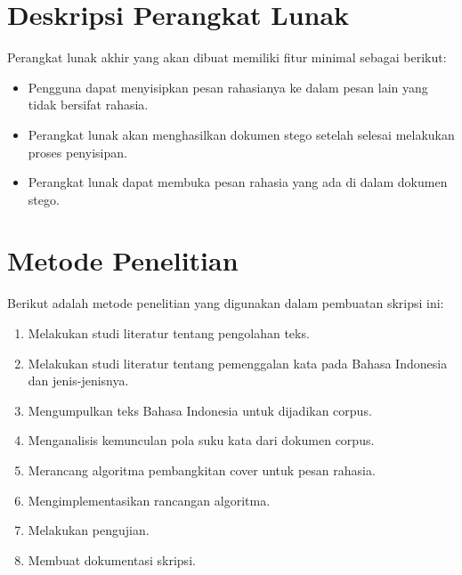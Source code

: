 \section{Deskripsi Perangkat Lunak}
\label{sec:Deskripsi Perangkat Lunak}
Perangkat lunak akhir yang akan dibuat memiliki fitur minimal sebagai berikut:
\begin{itemize}
	\item Pengguna dapat menyisipkan pesan rahasianya ke dalam pesan lain yang tidak bersifat rahasia.
	\item Perangkat lunak akan menghasilkan dokumen stego setelah selesai melakukan proses penyisipan.
	\item Perangkat lunak dapat membuka pesan rahasia yang ada di dalam dokumen stego.
\end{itemize}

\section{Metode Penelitian}
\label{sec:metodePenelitian}
Berikut adalah metode penelitian yang digunakan dalam pembuatan skripsi ini:
	\begin{enumerate}
		\item Melakukan studi literatur tentang pengolahan teks.
		\item Melakukan studi literatur tentang pemenggalan kata pada Bahasa Indonesia dan jenis-jenisnya.
		\item Mengumpulkan teks Bahasa Indonesia untuk dijadikan corpus.
		\item Menganalisis kemunculan pola suku kata dari dokumen corpus.
		\item Merancang algoritma pembangkitan cover untuk pesan rahasia.
		\item Mengimplementasikan rancangan algoritma.
		\item Melakukan pengujian.
		\item Membuat dokumentasi skripsi.
	\end{enumerate}